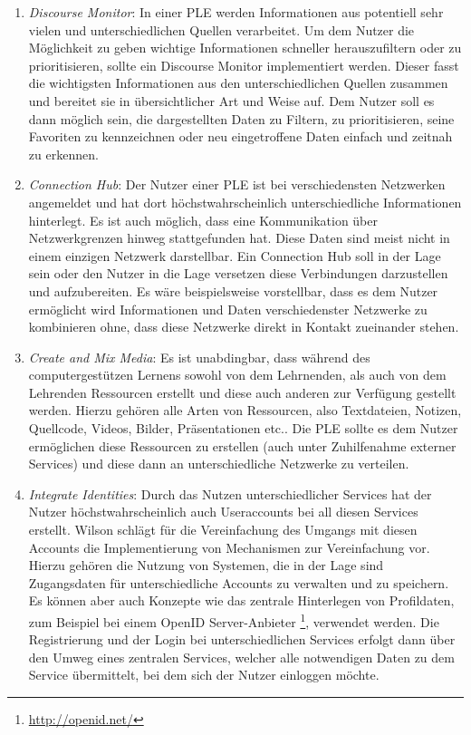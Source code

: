 \begin{enumerate}
 \item \emph{Discourse Monitor}\label{wilson_patterns:discourse_monitor}: In einer PLE werden Informationen aus potentiell sehr vielen und unterschiedlichen Quellen verarbeitet. Um dem Nutzer die Möglichkeit zu geben wichtige Informationen schneller herauszufiltern oder zu prioritisieren, sollte ein Discourse Monitor implementiert werden. Dieser fasst die wichtigsten Informationen aus den unterschiedlichen Quellen zusammen und bereitet sie in übersichtlicher Art und Weise auf. Dem Nutzer soll es dann möglich sein, die dargestellten Daten zu Filtern, zu prioritisieren, seine Favoriten zu kennzeichnen oder neu eingetroffene Daten einfach und zeitnah zu erkennen. 
 \item \emph{Connection Hub}: Der Nutzer einer PLE ist bei verschiedensten Netzwerken angemeldet und hat dort höchstwahrscheinlich unterschiedliche Informationen hinterlegt. Es ist auch möglich, dass eine Kommunikation über Netzwerkgrenzen hinweg stattgefunden hat. Diese Daten sind meist nicht in einem einzigen Netzwerk darstellbar. Ein Connection Hub soll in der Lage sein oder den Nutzer in die Lage versetzen diese Verbindungen darzustellen und aufzubereiten. Es wäre beispielsweise vorstellbar, dass es dem Nutzer ermöglicht wird Informationen und Daten verschiedenster Netzwerke zu kombinieren ohne, dass diese Netzwerke direkt in Kontakt zueinander stehen.
 \item \emph{Create and Mix Media}: Es ist unabdingbar, dass während des computergestützen Lernens sowohl von dem Lehrnenden, als auch von dem Lehrenden Ressourcen erstellt und diese auch anderen zur Verfügung gestellt werden. Hierzu gehören alle Arten von Ressourcen, also Textdateien, Notizen, Quellcode, Videos, Bilder, Präsentationen etc.. Die PLE sollte es dem Nutzer ermöglichen diese Ressourcen zu erstellen (auch unter Zuhilfenahme externer Services) und diese dann an unterschiedliche Netzwerke zu verteilen. 
 \item \emph{Integrate Identities}: Durch das Nutzen unterschiedlicher Services hat der Nutzer höchstwahrscheinlich auch Useraccounts bei all diesen Services erstellt. Wilson schlägt für die Vereinfachung des Umgangs mit diesen Accounts die Implementierung von Mechanismen zur Vereinfachung vor. Hierzu gehören die Nutzung von Systemen, die in der Lage sind Zugangsdaten für unterschiedliche Accounts zu verwalten und zu speichern. Es können aber auch Konzepte wie das zentrale Hinterlegen von Profildaten, zum Beispiel bei einem OpenID Server-Anbieter \footnote{\url{http://openid.net/}}, verwendet werden. Die Registrierung und der Login bei unterschiedlichen Services erfolgt dann über den Umweg eines zentralen Services, welcher alle notwendigen Daten zu dem Service übermittelt, bei dem sich der Nutzer einloggen möchte.  

\end{enumerate}
